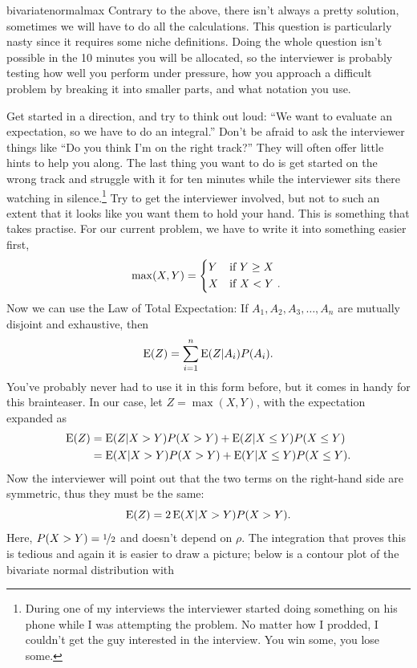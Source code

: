 \begin{answer}{bivariatenormalmax}
Contrary to the above, there isn't always a pretty solution, sometimes we will have to do all the calculations.
This question is particularly nasty since it requires some niche definitions.
Doing the whole question isn't possible in the 10 minutes you will be allocated, so the interviewer is probably testing how well you perform under pressure,
how you approach a difficult problem by breaking it into smaller parts,
and what notation you use.

Get started in a direction, and try to think out loud:
``We want to evaluate an expectation, so we have to do an integral.''
Don't be afraid to ask the interviewer things like ``Do you think I'm on the right track?''
They will often offer little hints to help you along.
The last thing you want to do is get started on the wrong track and struggle with it for ten minutes while the interviewer sits there watching in silence.\footnote{During one of my interviews the interviewer started doing something on his phone while I was attempting the problem. No matter how I prodded, I couldn't get the guy interested in the interview. You win some, you lose some.}
Try to get the interviewer involved, but not to such an extent that it looks like you want them to hold your hand.
This is something that takes practise.
For our current problem, we have to write it into something easier first,
\[
  \max(X, Y) =
  \begin{dcases*}
    Y & if $Y \geq X$\\
    X & if $X < Y$
  \text{.}
  \end{dcases*}
\]
Now we can use the Law of Total Expectation:
If $ A_1, A_2, A_3, \ldots, A_n$ are mutually disjoint and exhaustive, then
\[
  \operatorname{\mathrm{E}}(Z) = \sum_{i=1}^{n}{
    \operatorname{\mathrm{E}}(Z| A_i)P(A_i)
  }
  \text{.}
\]
You've probably never had to use it in this form before, but it comes in handy for this brainteaser.
In our case, let $Z=\max(X,Y)$, with the expectation expanded as
\begin{align*}
  \operatorname{\mathrm{E}}(Z) &= \operatorname{\mathrm{E}}(Z|X > Y)P(X>Y)
+          \operatorname{\mathrm{E}}(Z|X \leq Y)P(X \leq Y) \\
        &= \operatorname{\mathrm{E}}(X|X > Y)P(X>Y)
+          \operatorname{\mathrm{E}}(Y|X \leq Y)P(X \leq Y)
  \text{.}
\end{align*}
Now the interviewer will point out that the two terms on the right-hand side are symmetric, thus they must be the same:
\[
  \operatorname{\mathrm{E}}(Z) = 2 \operatorname{\mathrm{E}}(X|X > Y)P(X>Y)
  \text{.}
\]
Here, $P(X>Y) = \nicefrac{1}{2}$ and doesn't depend on $\rho$.
The integration that proves this is tedious and again it is easier to draw a picture; below is a contour plot of the bivariate normal distribution with

\end{answer}

